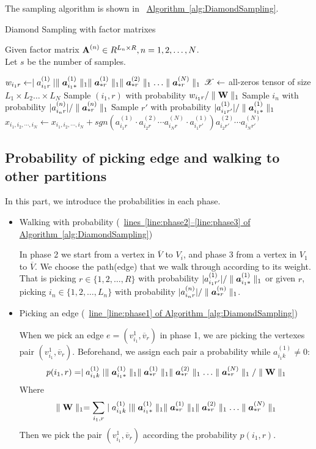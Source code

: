 \documentclass{article}
\newcommand{\Sca}[3]{{#1}^{(#2)}_{i_#2#3}}%
\newcommand{\T}[1]{\boldsymbol{\mathscr{\MakeUppercase{#1}}}}%
\newcommand{\V}[1]{{\bm{{\MakeLowercase{#1}}}}}%
\newcommand{\Varow}[1]{\V{a}^{(#1)}_{i_#1*}}
\newcommand{\Vacol}[1]{\V{a}^{(#1)}_{*r}}
\newcommand{\M}[1]{{\bm{\mathbf{\MakeUppercase{#1}}}}}%
\newcommand{\norm}[2]{\parallel#1\parallel_{#2}}
\newcommand{\Alg}[1]{\hyperref[alg:#1]{Algorithm~\ref*{alg:#1}}}
\newcommand{\AlgLine}[2]{\hyperref[alg:#1]{line~\ref*{line:#2} of Algorithm~\ref*{alg:#1}}}
\newcommand{\AlgLines}[3]{\hyperref[alg:#1]{lines~\ref*{line:#2}--\ref*{line:#3} of Algorithm~\ref*{alg:#1}}}
\begin{document}
The sampling algorithm is shown in ~\Alg{DiamondSampling}.

\begin{algorithm}[t]
    \caption{Diamond Sampling with factor matrixes}
    \label{alg:DiamondSampling}
    Given factor matrix $\M{A}^{(n)}\in R^{L_n\times R}, n = 1,2,\ldots,N$.\\
    Let $s$ be the number of samples.
    \begin{algorithmic}[1]
    \For{all $\Sca{a}{1}{r} \neq 0$}
    \State $w_{i_1r} \leftarrow \mid \Sca{a}{1}{r}\mid
    \norm{\Varow{1}}{1}\norm{\Vacol{1}}{1}\norm{\Vacol{2}}{1}\ldots\norm{\Vacol{N}}{1} $
    \EndFor
    \State $\T{X} \leftarrow$ all-zeros tensor of size
    $L_1\times L_2\ldots\times L_N$
    \State Sample $(i_1,r)$ with probability $w_{i_1r}/\norm{\M{W}}{1}$        \label{line:phase1}
    \State Sample $i_n$ with probability $|\Sca{a}{n}{r}|/\norm{\Vacol{n}}{1}$
    \label{line:phase2}
    \EndFor
    \State Sample $r'$ with probability $|\Sca{a}{1}{r'}|/\norm{\Varow{1}}{1}$
    \label{line:phase3}
    \State $x_{i_1,i_2,\cdots,i_N}\leftarrow x_{i_1,i_2,\cdots,i_N} +
    sgn(\Sca{a}{1}{r}\cdot\Sca{a}{2}{r}\cdots\Sca{a}{N}{r}\cdot\Sca{a}{1}{r'})
    \Sca{a}{2}{r'}\cdots\Sca{a}{N}{r'}$
    \label{line:scoring}
    \EndFor
    \end{algorithmic}
\end{algorithm}

\subsection{Probability of picking edge and walking to other partitions}

In this part, we introduce the probabilities in each phase.

\begin{itemize}
  \item Walking with probability  (~\AlgLines{DiamondSampling}{phase2}{phase3})

  In phase 2 we start from a vertex in $\overline{V}$ to $V_i$, and phase 3 from a vertex in $V_1$ to $\overline{V}$. We choose the path(edge) that we walk through according to its weight. That is picking $r\in\{1,2,\ldots,R\}$ with probability $|\Sca{a}{1}{r'}|/\norm{\Varow{1}}{1}$ or given $r$, picking $i_n\in\{1,2,\ldots,L_n\}$ with probability $|\Sca{a}{n}{r}|/\norm{\Vacol{n}}{1}$.

  \item Picking an edge (~\AlgLine{DiamondSampling}{phase1})

  When we pick an edge $e=(v^1_{i_1},\overline{v}_r)$ in phase 1, we are picking the vertexes pair $(v^1_{i_1},\overline{v}_r)$. Beforehand, we assign each pair a probability while $ \Sca{a}{1}{k} \neq 0 $:
  \[
    p(i_1,r) = \mid\Sca{a}{1}{k}\mid \norm{\Varow{1}}{1} \norm{\Vacol{1}}{1} \norm{\Vacol{2}}{1} \ldots \norm{\Vacol{N}}{1} / \norm{\M{W}}{1}
  \]
  Where
  \[
    \norm{\M{W}}{1} = \sum_{i_1,r}\mid \Sca{a}{1}{k}\mid \norm{\Varow{1}}{1} \norm{\Vacol{1}}{1} \norm{\Vacol{2}}{1} \ldots \norm{\Vacol{N}}{1}
  \]
  Then we pick the pair $(v^1_{i_1},\overline{v}_r)$ according the probability $p(i_1,r)$.
\end{itemize}
\end{document}
